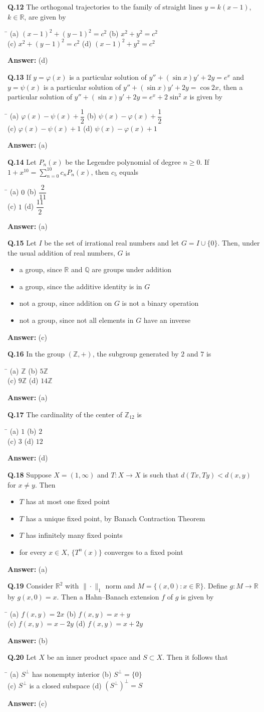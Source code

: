 \documentclass[11pt,a4paper]{article}
\newcommand{\optsfour}[4]{%
  \begin{tabbing}
    \hspace{0.48\linewidth}\=\kill
    (a) #1 \> (b) #2 \\[2pt]
    (c) #3 \> (d) #4
  \end{tabbing}%
}
\newcommand{\optslist}[4]{%
  \begin{itemize}
    \setlength{\itemsep}{2pt}\setlength{\parskip}{0pt}
    \item[(a)] #1
    \item[(b)] #2
    \item[(c)] #3
    \item[(d)] #4
  \end{itemize}%
}
\newcommand{\ans}[1]{\textbf{Answer:} #1\par\medskip}
\begin{document}
\textbf{Q.12} The orthogonal trajectories to the family of straight lines $y = k(x - 1)$, $k \in \mathbb{R}$, are given by
\optsfour{$(x - 1)^2 + (y - 1)^2 = c^2$}{$x^2 + y^2 = c^2$}{$x^2 + (y - 1)^2 = c^2$}{$(x - 1)^2 + y^2 = c^2$}
\ans{(d)}

\textbf{Q.13} If $y = \varphi(x)$ is a particular solution of $y'' + (\sin x)y' + 2y = e^x$ and $y = \psi(x)$ is a particular solution of $y'' + (\sin x)y' + 2y = \cos 2x$, then a particular solution of $y'' + (\sin x)y' + 2y = e^x + 2\sin^2 x$ is given by
\optsfour{$\varphi(x) - \psi(x) + \dfrac{1}{2}$}{$\psi(x) - \varphi(x) + \dfrac{1}{2}$}{$\varphi(x) - \psi(x) + 1$}{$\psi(x) - \varphi(x) + 1$}
\ans{(a)}

\textbf{Q.14} Let $P_n(x)$ be the Legendre polynomial of degree $n \ge 0$. If $1 + x^{10} = \displaystyle\sum_{n=0}^{10} c_n P_n(x)$, then $c_5$ equals
\optsfour{$0$}{$\dfrac{2}{11}$}{$1$}{$\dfrac{11}{2}$}
\ans{(a)}

\textbf{Q.15} Let $I$ be the set of irrational real numbers and let $G = I \cup \{0\}$. Then, under the usual addition of real numbers, $G$ is
\optslist{a group, since $\mathbb{R}$ and $\mathbb{Q}$ are groups under addition}{a group, since the additive identity is in $G$}{not a group, since addition on $G$ is not a binary operation}{not a group, since not all elements in $G$ have an inverse}
\ans{(c)}

\textbf{Q.16} In the group $(\mathbb{Z}, +)$, the subgroup generated by $2$ and $7$ is
\optsfour{$\mathbb{Z}$}{$5\mathbb{Z}$}{$9\mathbb{Z}$}{$14\mathbb{Z}$}
\ans{(a)}

\textbf{Q.17} The cardinality of the center of $\mathbb{Z}_{12}$ is
\optsfour{$1$}{$2$}{$3$}{$12$}
\ans{(d)}

\textbf{Q.18} Suppose $X = (1, \infty)$ and $T : X \to X$ is such that $d(Tx, Ty) < d(x, y)$ for $x \ne y$. Then
\optslist{$T$ has at most one fixed point}{$T$ has a unique fixed point, by Banach Contraction Theorem}{$T$ has infinitely many fixed points}{for every $x \in X$, $\{T^n(x)\}$ converges to a fixed point}
\ans{(a)}

\textbf{Q.19} Consider $\mathbb{R}^2$ with $\|\cdot\|_1$ norm and $M = \{(x, 0) : x \in \mathbb{R}\}$. Define $g : M \to \mathbb{R}$ by $g(x, 0) = x$. Then a Hahn--Banach extension $f$ of $g$ is given by
\optsfour{$f(x, y) = 2x$}{$f(x, y) = x + y$}{$f(x, y) = x - 2y$}{$f(x, y) = x + 2y$}
\ans{(b)}

\textbf{Q.20} Let $X$ be an inner product space and $S \subset X$. Then it follows that
\optsfour{$S^\perp$ has nonempty interior}{$S^\perp = \{0\}$}{$S^\perp$ is a closed subspace}{$(S^\perp)^\perp = S$}
\ans{(c)}
\end{document}

